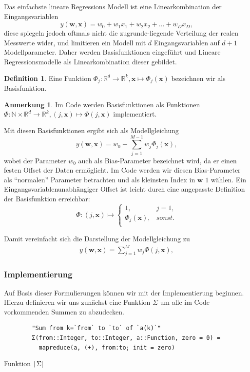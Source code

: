 \documentclass{article}
\theoremstyle{plain} %
\theoremstyle{definition} %
\newtheorem{definition}[theorem]{Definition}
\newtheorem{anno}[theorem]{Anmerkung}
\begin{document}
Das einfachste lineare Regressions Modell ist eine Linearkombination der Eingangsvariablen 
$$
  y(\mathbf{w}, \mathbf{x}) = w_0 + w_1x_1 + w_2x_2 + \hdots + w_Dx_D,
$$
diese spiegeln jedoch oftmals nicht die zugrunde-liegende Verteilung der realen Messwerte wider, und limitieren ein Modell mit $d$ Eingangsvariablen auf $d+1$ Modellparameter. Daher werden Basisfunktionen eingeführt und Lineare Regressionsmodelle als Linearkombination dieser gebildet.
\begin{definition}
  Eine Funktion $\Phi_j: \mathbb{R}^d \rightarrow \mathbb{R}^k, \mathbf{x} \mapsto \Phi_j(\mathbf{x})$ bezeichnen wir als Basisfunktion.
\end{definition}
\begin{anno}
  Im Code werden Basisfunktionen als Funktionen $\Phi: \mathbb{N} \times \mathbb{R}^d \rightarrow \mathbb{R}^k, (j, \mathbf{x}) \mapsto \Phi(j, \mathbf{x})$ implementiert.
\end{anno}

Mit diesen Basisfunktionen ergibt sich als Modellgleichung
$$
  y(\mathbf{w}, \mathbf{x}) = w_0 + \sum_{j=1}^{M-1}w_j\Phi_j(\mathbf{x}),
$$
wobei der Parameter $w_0$ auch als Bias-Parameter bezeichnet wird, da er einen festen Offset der Daten ermöglicht. Im Code werden wir diesen Bias-Parameter als ``normalen'' Parameter betrachten und als kleinsten Index in $\mathbf{w}$ $1$ wählen. Ein Eingangsvariablenunabhängiger Offset ist leicht durch eine angepasste Definition der Basisfunktion erreichbar:
\[ \Phi: (j, \mathbf{x}) \mapsto
 \left\{
  \begin{array}{ll}
    1,& j=1, \\
    \Phi_j(\mathbf{x}), & sonst. \\  
  \end{array}
\right. \]

Damit vereinfacht sich die Darstellung der Modellgleichung zu
\begin{align}
  y(\mathbf{w}, \mathbf{x}) = \sum_{j=1}^{M}w_j\Phi(j, \mathbf{x}), \label{y}
\end{align}

\subsubsection{Implementierung}
Auf Basis dieser Formulierungen können wir mit der Implementierung beginnen.
Hierzu definieren wir uns zunächst eine Funktion \texttt{$\Sigma$} um alle im Code vorkommenden Summen zu abzudecken.

\begin{listing}[H] %
    \begin{verbatim}
        "Sum from k=`from` to `to` of `a(k)`"
        Σ(from::Integer, to::Integer, a::Function, zero = 0) =
          mapreduce(a, (+), from:to; init = zero)
    \end{verbatim}
    \caption{Funktion \texttt|Σ|}
\end{listing}
\end{document}
